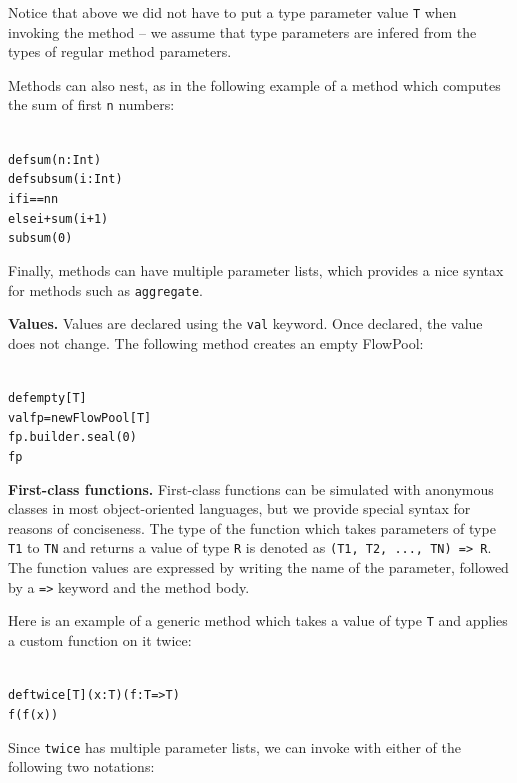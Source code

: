 \documentclass[runningheads,a4paper]{llncs}
\begin{document}
Notice that above we did not have to put a type parameter value \verb=T= when
invoking the method -- we assume that type parameters are infered from the
types of regular method parameters.

Methods can also nest, as in the following example of a method which computes
the sum of first \verb=n= numbers:

\begin{minipage}[b]{3.75 cm}
\begin{alltt}
{\scriptsize
def sum(n: Int)
  def subsum(i: Int)
    if i == n n
    else i + sum(i + 1)
  subsum(0)
}
\end{alltt}
\end{minipage}

Finally, methods can have multiple parameter lists, which provides a nice syntax
for methods such as \verb=aggregate=.


\textbf{Values.}
Values are declared using the \verb=val= keyword.
Once declared, the value does not change.
The following method creates an empty FlowPool:

\begin{minipage}[b]{3.75 cm}
\begin{alltt}
{\scriptsize
def empty[T]
  val fp = new FlowPool[T]
  fp.builder.seal(0)
  fp
}
\end{alltt}
\end{minipage}

\textbf{First-class functions.}
First-class functions can be simulated with anonymous classes in most object-oriented
languages, but we provide special syntax for reasons of conciseness.
The type of the function which takes parameters of type \verb=T1= to \verb=TN= and
returns a value of type \verb=R= is denoted as \verb+(T1, T2, ..., TN) => R+.
The function values are expressed by writing the name of the parameter, followed by
a \verb+=>+ keyword and the method body.

Here is an example of a generic method which takes a value of type \verb=T= and
applies a custom function on it twice:

\begin{minipage}[b]{3.75 cm}
\begin{alltt}
{\scriptsize
def twice[T](x: T)(f: T => T)
  f(f(x))
}
\end{alltt}
\end{minipage}

Since \verb=twice= has multiple parameter lists, we can invoke with either of the
following two notations:
\end{document}
